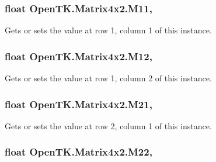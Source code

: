 \hypertarget{struct_open_t_k_1_1_matrix4x2_a94441ef072047b0466d1e6a25eff90ae}{
\subsubsection[{M11}]{\setlength{\rightskip}{0pt plus 5cm}float Open\-T\-K.\-Matrix4x2.\-M11\hspace{0.3cm}{\ttfamily [get]}, {\ttfamily [set]}}}\label{struct_open_t_k_1_1_matrix4x2_a94441ef072047b0466d1e6a25eff90ae}


Gets or sets the value at row 1, column 1 of this instance. 

\hypertarget{struct_open_t_k_1_1_matrix4x2_adae663c7341cf13dd704b0898d12ad26}{
\subsubsection[{M12}]{\setlength{\rightskip}{0pt plus 5cm}float Open\-T\-K.\-Matrix4x2.\-M12\hspace{0.3cm}{\ttfamily [get]}, {\ttfamily [set]}}}\label{struct_open_t_k_1_1_matrix4x2_adae663c7341cf13dd704b0898d12ad26}


Gets or sets the value at row 1, column 2 of this instance. 

\hypertarget{struct_open_t_k_1_1_matrix4x2_a1ae21922f119e789234623ebc0cc4041}{
\subsubsection[{M21}]{\setlength{\rightskip}{0pt plus 5cm}float Open\-T\-K.\-Matrix4x2.\-M21\hspace{0.3cm}{\ttfamily [get]}, {\ttfamily [set]}}}\label{struct_open_t_k_1_1_matrix4x2_a1ae21922f119e789234623ebc0cc4041}


Gets or sets the value at row 2, column 1 of this instance. 

\hypertarget{struct_open_t_k_1_1_matrix4x2_aa0cc49d4f6bd80af78d29f2b4f159920}{
\subsubsection[{M22}]{\setlength{\rightskip}{0pt plus 5cm}float Open\-T\-K.\-Matrix4x2.\-M22\hspace{0.3cm}{\ttfamily [get]}, {\ttfamily [set]}}}\label{struct_open_t_k_1_1_matrix4x2_aa0cc49d4f6bd80af78d29f2b4f159920}


